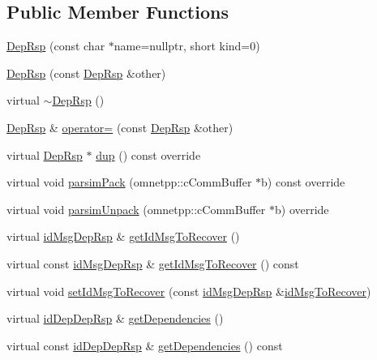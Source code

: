 \subsection*{Public Member Functions}
\begin{DoxyCompactItemize}
\item 
\hyperlink{class_dep_rsp_a86d6896d681e4467ec52c660738893ed}{Dep\+Rsp} (const char $\ast$name=nullptr, short kind=0)
\item 
\hyperlink{class_dep_rsp_a3b5894b34b151dced8080a6e5757c2a2}{Dep\+Rsp} (const \hyperlink{class_dep_rsp}{Dep\+Rsp} \&other)
\item 
virtual \hyperlink{class_dep_rsp_aa4c1e70c5fd15e5a9541b58999df3480}{$\sim$\+Dep\+Rsp} ()
\item 
\hyperlink{class_dep_rsp}{Dep\+Rsp} \& \hyperlink{class_dep_rsp_a3297f65b6eb05d7d5d203562b4d48c4a}{operator=} (const \hyperlink{class_dep_rsp}{Dep\+Rsp} \&other)
\item 
virtual \hyperlink{class_dep_rsp}{Dep\+Rsp} $\ast$ \hyperlink{class_dep_rsp_af70e467ce29aac0e865ac06c3a021019}{dup} () const override
\item 
virtual void \hyperlink{class_dep_rsp_a2125eed5bc70db3cc55e41e144c8716f}{parsim\+Pack} (omnetpp\+::c\+Comm\+Buffer $\ast$b) const override
\item 
virtual void \hyperlink{class_dep_rsp_a8d8d59c349898c4dfb9da1845ba0acdd}{parsim\+Unpack} (omnetpp\+::c\+Comm\+Buffer $\ast$b) override
\item 
virtual \hyperlink{dep_rsp__m_8h_a8a41011e0821f196429cd4bc45638bcf}{id\+Msg\+Dep\+Rsp} \& \hyperlink{class_dep_rsp_a7558f4f82be1ce27c894a068e2811ec6}{get\+Id\+Msg\+To\+Recover} ()
\item 
virtual const \hyperlink{dep_rsp__m_8h_a8a41011e0821f196429cd4bc45638bcf}{id\+Msg\+Dep\+Rsp} \& \hyperlink{class_dep_rsp_a209fe969214c0bf673d12a27bb923f92}{get\+Id\+Msg\+To\+Recover} () const
\item 
virtual void \hyperlink{class_dep_rsp_a6aea88bdf4ba7b9c4876823278e880b0}{set\+Id\+Msg\+To\+Recover} (const \hyperlink{dep_rsp__m_8h_a8a41011e0821f196429cd4bc45638bcf}{id\+Msg\+Dep\+Rsp} \&\hyperlink{class_dep_rsp_a7b777428e859ba7a6f083e13f6431cf4}{id\+Msg\+To\+Recover})
\item 
virtual \hyperlink{dep_rsp__m_8h_a3c2ceb107008eb344443aaab2eb872b8}{id\+Dep\+Dep\+Rsp} \& \hyperlink{class_dep_rsp_a507c1f42135deca6079b31f5fe8da301}{get\+Dependencies} ()
\item 
virtual const \hyperlink{dep_rsp__m_8h_a3c2ceb107008eb344443aaab2eb872b8}{id\+Dep\+Dep\+Rsp} \& \hyperlink{class_dep_rsp_ad7d207f5cb583e04c7a8a6127bcb3fff}{get\+Dependencies} () const

\end{DoxyCompactItemize}
